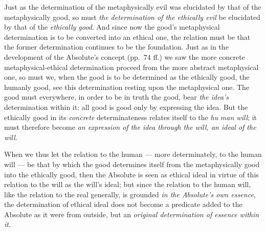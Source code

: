 \documentclass[12pt,a4paper]{book}
\begin{document}
Just as the determination of the metaphysically evil was elucidated by that of
the metaphysically good, so must \emph{the determination of the ethically evil}
be elucidated by that of the \emph{ethically good}. And since now the good's
metaphysical determination is to be converted into an ethical one, the relation
must be that the former determination continues to be the foundation. Just as
in the development of the Absolute's concept (pp.\ 74 ff.) we saw the more
concrete metaphysical-ethical determination proceed from the more abstract
metaphysical one, so must we, when the good is to be determined as the
ethically good, the humanly good, see this determination resting upon the
metaphysical one. The good must everywhere, in order to be in truth the good,
bear \emph{the idea's} determination within it: all good is good only by
expressing the idea. But the ethically good in its \emph{concrete}
determinateness relates itself to the \emph{hu}\-%
\emph{man will}; it must therefore become \emph{an expression of the idea
through the will, an ideal of the will}.

When we thus let the relation to the human --- more determinately, to the human
will --- be that by which the good determines itself from the metaphysically
good into the ethically good, then the Absolute is seen as ethical ideal in
virtue of this relation to the will as the will's ideal; but since the relation
to the human will, like the relation to the real generally, is grounded \emph{in
the Absolute's own essence}, the determination of ethical ideal does not become
a predicate added to the Absolute as it were from outside, but an
\emph{original determination of essence within it}.
\end{document}
